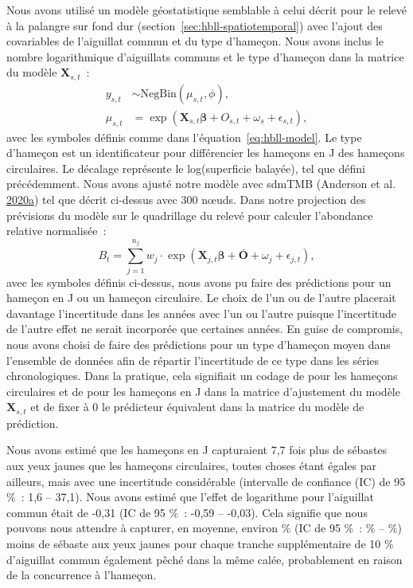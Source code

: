 \documentclass[french,11pt]{book}
\begin{document}
Nous avons utilisé un modèle géostatistique semblable à celui décrit pour le relevé à la palangre sur fond dur (section~\ref{sec:hbll-spatiotemporal}) avec l'ajout des covariables de l'aiguillat commun et du type d'hameçon. Nous avons inclus le nombre logarithmique d'aiguillats communs et le type d'hameçon dans la matrice du modèle \(\bm{X}_{s,t}\)~:
\begin{align}
  y_{s,t} &\sim \mathrm{NegBin}(\mu_{s,t}, \phi),\\
  \mu_{s,t} &= \exp \left( \bm{X}_{s,t} \bm{\beta} + O_{s,t} + \omega_s + \epsilon_{s,t} \right),
\label{eq:dogfish-model}
\end{align}
avec les symboles définis comme dans l'équation~\ref{eq:hbll-model}. Le type d'hameçon est un identificateur pour différencier les hameçons en J des hameçons circulaires. Le décalage représente le log(superficie balayée), tel que défini précédemment. Nous avons ajusté notre modèle avec sdmTMB (Anderson et al. \protect\hyperlink{ref-sdmtmb}{2020}\protect\hyperlink{ref-sdmtmb}{a}) tel que décrit ci-dessus avec 300 nœuds. Dans notre projection des prévisions du modèle sur le quadrillage du relevé pour calculer l'abondance relative normalisée~:
\begin{equation}
B_t = \sum_{j = 1}^{n_j}
  w_j \cdot \exp \left( \bm{X}_{j,t} \bm{\beta} + \bar{\bm{O}} + \omega_j + \epsilon_{j,t} \right),
\label{eq:dog-prediction}
\end{equation}
avec les symboles définis ci-dessus, nous avons pu faire des prédictions pour un hameçon en J ou un hameçon circulaire. Le choix de l'un ou de l'autre placerait davantage l'incertitude dans les années avec l'un ou l'autre puisque l'incertitude de l'autre effet ne serait incorporée que certaines années. En guise de compromis, nous avons choisi de faire des prédictions pour un type d'hameçon moyen dans l'ensemble de données afin de répartir l'incertitude de ce type dans les séries chronologiques. Dans la pratique, cela signifiait un codage de  pour les hameçons circulaires et de  pour les hameçons en J dans la matrice d'ajustement du modèle \(\bm{X}_{s,t}\) et de fixer à 0 le prédicteur équivalent dans la matrice du modèle de prédiction.

Nous avons estimé que les hameçons en J capturaient 7,7 fois plus de sébastes aux yeux jaunes que les hameçons circulaires, toutes choses étant égales par ailleurs, mais avec une incertitude considérable (intervalle de confiance (IC) de 95 \%~: 1,6 -- 37,1). Nous avons estimé que l'effet de logarithme pour l'aiguillat commun était de -0,31 (IC de 95 \%~: -0,59 -- -0,03). Cela signifie que nous pouvons nous attendre à capturer, en moyenne, environ \% (IC de 95 \%~: \% -- \%) moins de sébaste aux yeux jaunes pour chaque tranche supplémentaire de 10 \% d'aiguillat commun également pêché dans la même calée, probablement en raison de la concurrence à l'hameçon.
\end{document}
